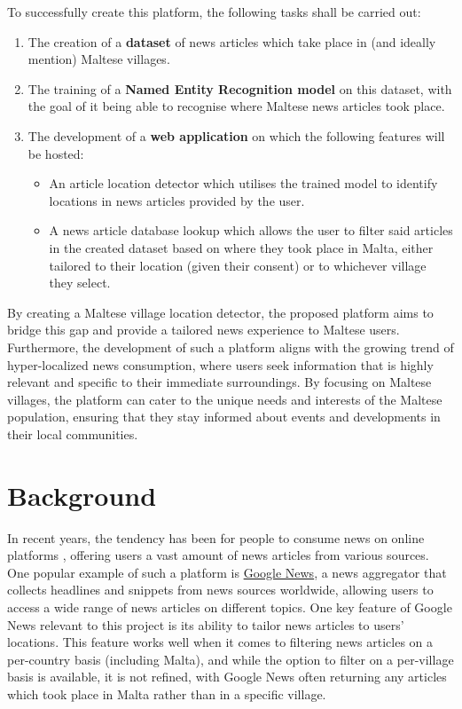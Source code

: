 \documentclass[a4paper, oneside, 11pt]{article}
\begin{document}
\begin{multicols*}{2}
  To successfully create this platform, the following tasks shall be carried out:
  \begin{enumerate}
    \item The creation of a \textbf{dataset} of news articles which take place in (and ideally mention) Maltese villages.
    \item The training of a \textbf{Named Entity Recognition model} on this dataset, with the goal of it being able to recognise where Maltese news articles took place.
    \item The development of a \textbf{web application} on which the following features will be hosted:
    \begin{itemize}
      \item An article location detector which utilises the trained model to identify locations in news articles provided by the user.
      \item A news article database lookup which allows the user to filter said articles in the created dataset based on where they took place in Malta, either tailored to their location (given their consent) or to whichever village they select.
    \end{itemize}
  \end{enumerate}

  By creating a Maltese village location detector, the proposed platform aims to bridge this gap and provide a tailored news experience to Maltese users. Furthermore, the development of such a platform aligns with the growing trend of hyper-localized news consumption, where users seek information that is highly relevant and specific to their immediate surroundings. By focusing on Maltese villages, the platform can cater to the unique needs and interests of the Maltese population, ensuring that they stay informed about events and developments in their local communities.


  \section{Background}
  In recent years, the tendency has been for people to consume news on online platforms \cite{bennett2008digital} \cite{ripolles2012beyond}, offering users a vast amount of news articles from various sources. One popular example of such a platform is \href{https://news.google.com/}{Google News}, a news aggregator that collects headlines and snippets from news sources worldwide, allowing users to access a wide range of news articles on different topics. One key feature of Google News relevant to this project is its ability to tailor news articles to users' locations. This feature works well when it comes to filtering news articles on a per-country basis (including Malta), and while the option to filter on a per-village basis is available, it is not refined, with Google News often returning any articles which took place in Malta rather than in a specific village.


\end{multicols*}
\end{document}
